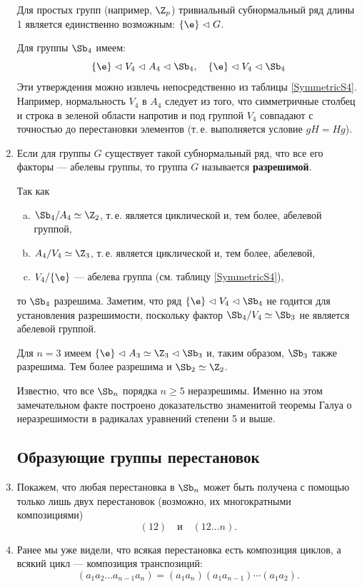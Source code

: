 \begin{enumerate}
Для простых групп (например, $\Z_p$) тривиальный субнормальный ряд длины 1 является единственно возможным: $\{\e\}\vartriangleleft G$.

Для группы $\Sb_4$ имеем: 
$$
\{\e\}\vartriangleleft V_4\vartriangleleft A_4\vartriangleleft\Sb_4,\quad\{\e\}\vartriangleleft V_4\vartriangleleft\Sb_4
$$
Эти утверждения можно извлечь непосредственно из таблицы \ref{SymmetricS4}. Например, нормальность $V_4$ в $A_4$ следует из того, что симметричные столбец и строка в зеленой области напротив и под группой $V_4$ совпадают с точностью до перестановки элементов (т.\,е. выполняется условие $gH=Hg$).

\item Если для группы $G$ существует такой субнормальный ряд, что все его факторы --- абелевы группы, то группа $G$ называется \textbf{разрешимой}.

Так как
\begin{enumerate}[a)]
\item $\Sb_4/A_4\simeq\Z_2$, т.\,е. является циклической и, тем более, абелевой группой,
\item $A_4/V_4\simeq\Z_3$, т.\,е. является циклической и, тем более, абелевой,
\item $V_4/\{\e\}$ --- абелева группа (см. таблицу \ref{SymmetricS4}),
\end{enumerate}
то $\Sb_4$ разрешима. Заметим, что ряд $\{\e\}\vartriangleleft V_4\vartriangleleft\Sb_4$ не годится для установления разрешимости, поскольку фактор $\Sb_4/V_4\simeq\Sb_3$ не является абелевой группой.

Для $n=3$ имеем $\{\e\}\vartriangleleft A_3\simeq\Z_3\vartriangleleft\Sb_3$ и, таким образом, $\Sb_3$ также разрешима. Тем более разрешима и $\Sb_2\simeq\Z_2$.

Известно, что все $\Sb_n$ порядка $n\ge 5$ неразрешимы. Именно на этом замечательном факте построено доказательство знаменитой теоремы Галуа о неразрешимости в радикалах уравнений степени 5 и выше.





\subsection*{Образующие группы перестановок}


\item Покажем, что любая перестановка в $\Sb_n$ может быть получена с помощью только лишь двух перестановок (возможно, их многократными композициями)
$$
(12)\quad\mbox{и}\quad(12\dots n).
$$
\item Ранее мы уже видели, что всякая перестановка есть композиция циклов, а всякий цикл --- композиция транспозиций:
\begin{equation}\label{transp}
(a_1a_2\dots a_{n-1}a_n) = (a_1a_n)(a_1a_{n-1})\cdots(a_1a_2).
\end{equation}


\end{enumerate}
